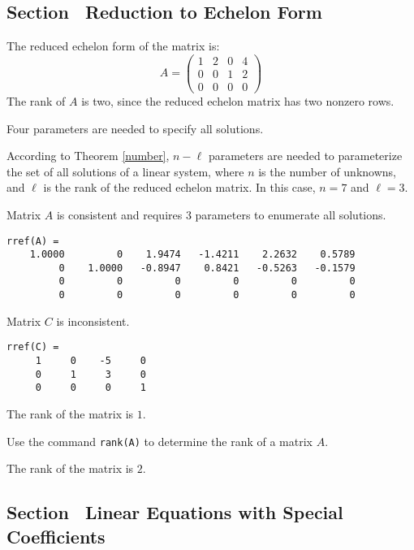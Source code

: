 \subsection*{Section~\protect{\ref{S:2.4}} Reduction to Echelon Form}

The reduced echelon form of the matrix is:
\[
A = \left(\begin{array}{rrrr} 1 & 2 & 0 & 4 \\ 0 & 0 & 1 & 2 \\ 0 & 0 & 0
& 0\end{array}\right)
\]
The rank of $A$ is two, since the reduced echelon matrix has two nonzero
rows.

\ans Four parameters are needed to specify all solutions.

\soln According to Theorem \ref{number}, $n - \ell$
parameters are needed to parameterize the set of all solutions of a
linear system, where $n$ is the number of unknowns, and $\ell$ is the
rank of the reduced echelon matrix.  In this case, $n = 7$ and $\ell =
3$.

\ans Matrix $A$ is consistent and requires 3 parameters to enumerate
all solutions.

\soln
\begin{verbatim}
rref(A) = 
    1.0000         0    1.9474   -1.4211    2.2632    0.5789
         0    1.0000   -0.8947    0.8421   -0.5263   -0.1579
         0         0         0         0         0         0
         0         0         0         0         0         0
\end{verbatim}

\ans Matrix $C$ is inconsistent.

\soln
\begin{verbatim}
rref(C) =
     1     0    -5     0
     0     1     3     0
     0     0     0     1
\end{verbatim}

 \ans The rank of the matrix is $1$.

\soln Use the \Matlab command {\tt rank(A)} to determine the rank of a 
matrix $A$.

\newpage
{} The rank of the matrix is $2$.



\subsection*{Section~\protect{\ref{S:specialcoeff}} Linear Equations with
Special Coefficients}

